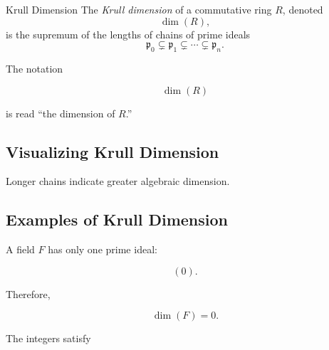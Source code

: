 \begin{definitionbox}{Krull Dimension}
The \emph{Krull dimension} of a commutative ring \(R\), denoted
\[ \dim(R), \]
is the supremum of the lengths of chains of prime ideals
\[ \mathfrak p_0\subsetneq\mathfrak p_1\subsetneq\cdots\subsetneq\mathfrak p_n. \]
\end{definitionbox}

The notation

\[ \dim(R) \]

is read ``the dimension of \(R\).''

\subsection{Visualizing Krull Dimension}
\label{subsec:krull-dimension-visual}

\begin{center}
\end{center}

Longer chains indicate greater algebraic dimension.

\subsection{Examples of Krull Dimension}
\label{subsec:krull-dimension-examples}

A field \(F\) has only one prime ideal:

\[ (0). \]

Therefore,

\[ \dim(F)=0. \]

The integers satisfy

